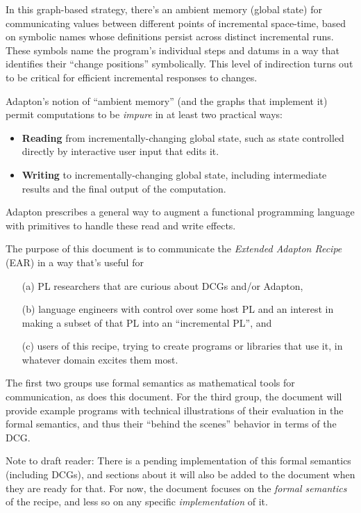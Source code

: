 \documentclass[11pt]{article}
\begin{document}
In this graph-based strategy, there's an ambient memory (global state)
for communicating values between different points of incremental
space-time, based on symbolic names whose definitions persist across
distinct incremental runs.
%
These symbols name the program's individual steps and datums in a way
that identifies their ``change positions'' symbolically.
%
This level of indirection turns out to be critical for efficient
incremental responses to changes.

Adapton's notion of ``ambient memory'' (and the graphs that implement
it) permit computations to be \emph{impure} in at least two practical
ways:

\begin{itemize}

\item \textbf{Reading} from incrementally-changing global state, such as state controlled directly by interactive user input that edits it.
  
\item \textbf{Writing} to incrementally-changing global state, including intermediate results and the final output of the computation.

\end{itemize}

Adapton prescribes a general way to augment a functional
programming language with primitives to handle these read and write effects.

The purpose of this document is to communicate the \emph{Extended Adapton Recipe} (EAR) in a way that's useful for\begin{itemize}
\item[(a)] PL researchers that are curious about DCGs and/or Adapton,
\item[(b)] language engineers with control over some host PL and an interest in making a subset of that PL into an ``incremental PL'', and
\item[(c)] users of this recipe, trying to create programs or libraries that use it, in whatever domain excites them most.
\end{itemize}

The first two groups use formal semantics as mathematical tools for communication, as does this document.
%
For the third group, the document will provide example programs with technical illustrations of
their evaluation in the formal semantics, and thus their ``behind the scenes'' behavior in terms of the DCG.

Note to draft reader: There is a pending implementation of this formal
semantics (including DCGs), and sections about it will also be added to the document
when they are ready for that. For now, the document focuses on the
\emph{formal semantics} of the recipe, and less so on any specific
\emph{implementation} of it.
  
\end{document}
